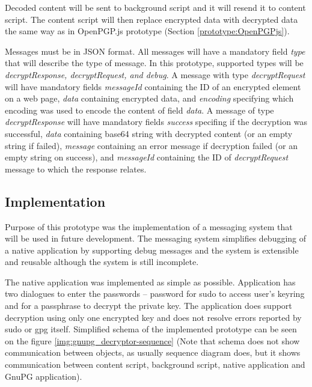 Decoded content will be sent to background script and it will resend it to content script. The content script will then replace encrypted data with decrypted data the same way as in OpenPGP.js prototype (Section \ref{prototype:OpenPGPjs}).

Messages must be in JSON format. All messages will have a mandatory field \textit{type} that will describe the type of message. In this prototype, supported types will be \textit{decryptResponse, decryptRequest, and debug}. A message with type \textit{decryptRequest} will have mandatory fields \textit{messageId} containing the ID of an encrypted element on a web page, \textit{data} containing encrypted data, and \textit{encoding} specifying which encoding was used to encode the content of field \textit{data}. A message of type \textit{decryptResponse} will have mandatory fields \textit{success} specifing if the decryption was successful, \textit{data} containing base64 string with decrypted content (or an empty string if failed),  \textit{message} containing an error message if decryption failed (or an empty string on success), and \textit{messageId} containing the ID of \textit{decryptRequest} message to which the response relates.

\subsection{Implementation}
Purpose of this prototype was the implementation of a messaging system that will be used in future development. The messaging system simplifies debugging of a native application by supporting debug messages and the system is extensible and reusable although the system is still incomplete.

The native application was implemented as simple as possible. Application has two dialogues to enter the passwords -- password for sudo to access user's keyring and for a passphrase to decrypt the private key. The application does support decryption using only one encrypted key and does not resolve errors reported by sudo or gpg itself. Simplified schema of the implemented prototype can be seen on the figure \ref{img:gnupg_decryptor-sequence} (Note that schema does not show communication between objects, as usually sequence diagram does, but it shows communication between content script, background script, native application and GnuPG application).

